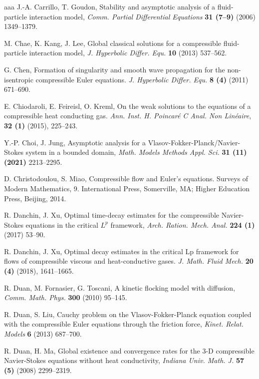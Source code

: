\documentclass[reqno,11pt]{amsart}
\theoremstyle{plain}
\numberwithin{equation}{section}
\begin{document}
\begin{thebibliography}{aaa}
 J.-A. Carrillo, T. Goudon,  
Stability and asymptotic analysis of a fluid-particle interaction model, 
{\it Comm. Partial Differential Equations}   \textbf{31 (7--9)} (2006) 1349--1379. 

 M. Chae, K. Kang, J. Lee, 
Global classical solutions for a compressible fluid-particle interaction model,
{\it J. Hyperbolic Differ. Equ.}   {\bf 10} (2013) 537--562.

 
  G. Chen, 
Formation of singularity and smooth wave propagation for the non-isentropic compressible Euler equations.  
{\it J. Hyperbolic Differ. Equ.} \textbf{8 (4)} (2011)    671--690.


 E. Chiodaroli, E.  Feireisl, O.  Kreml, 
On the weak solutions to the equations of a compressible heat conducting gas.  
{\it Ann. Inst. H. Poincar\'{e} C Anal. Non Lin\'{e}aire}, {\bf 32 (1)} (2015),   225--243.
 
 
Y.-P. Choi, J. Jung,  
Asymptotic analysis for a Vlasov-Fokker-Planck/Navier-Stokes system in a bounded domain,
{\it Math. Models Methods Appl. Sci.} {\bf 31 (11) (2021)} 2213--2295.

 D. Christodoulou, S.  Miao,  
Compressible flow and Euler's equations.
Surveys of Modern Mathematics, 9. International Press, Somerville, MA; Higher Education Press, Beijing, 2014. 


 R. Danchin, J. Xu, 
 Optimal time-decay estimates for the compressible Navier-Stokes equations in the 
 critical $L^p$ framework, {\it Arch. Ration. Mech. Anal.} {\bf 224 (1)} (2017) 53--90.

 R. Danchin, J.  Xu,   Optimal decay estimates in 
the critical Lp framework for flows of compressible viscous and heat-conductive gases. 
{\it J. Math. Fluid Mech.} {\bf  20 (4)} (2018),   1641--1665.  

 R. Duan, M. Fornasier, G. Toscani, 
A kinetic flocking model with diffusion,
{\it Comm. Math. Phys.}   {\bf 300} (2010) 95--145.

 R. Duan, S. Liu, 
Cauchy problem on the Vlasov-Fokker-Planck equation coupled with the compressible Euler
 equations through the friction force,
{\it Kinet. Relat. Models}   {\bf 6} (2013) 687--700.

R. Duan, H. Ma, 
Global existence and convergence rates for the 3-D compressible Navier-Stokes equations
 without heat conductivity,
{\it Indiana Univ. Math. J.} {\bf 57 (5)} (2008)  2299--2319.





\end{thebibliography}
\end{document}
